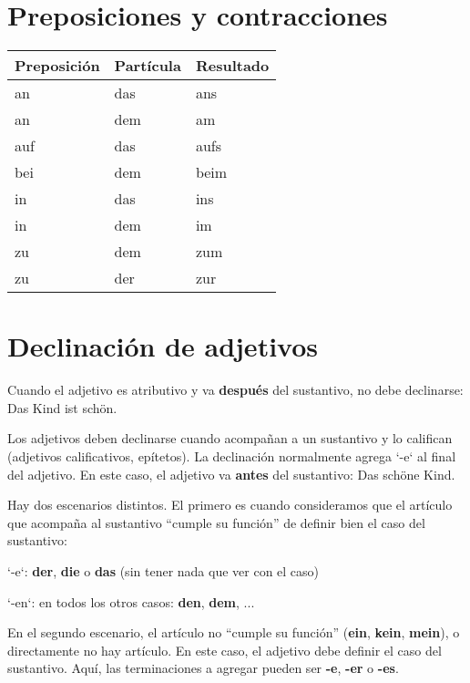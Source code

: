 \section{Preposiciones y contracciones}
\begin{tabular}{| l | l | l |}
\hline
\textbf{Preposición} & \textbf{Partícula} & \textbf{Resultado} \\
\hline
an & das & ans \\
an & dem & am \\
auf & das & aufs \\
bei & dem & beim \\
in & das & ins \\
in & dem & im \\
zu & dem & zum \\
zu & der & zur \\
\hline
\end{tabular}

\section{Declinación de adjetivos}
Cuando el adjetivo es atributivo y va \textbf{después} del sustantivo, no debe declinarse: Das Kind ist schön.

Los adjetivos deben declinarse cuando acompañan a un sustantivo y lo califican (adjetivos calificativos, epítetos). La declinación normalmente agrega `-e` al final del adjetivo. En este caso, el adjetivo va \textbf{antes} del sustantivo: Das schöne Kind. 

Hay dos escenarios distintos. El primero es cuando consideramos que el artículo que acompaña al sustantivo ``cumple su función'' de definir bien el caso del sustantivo:
\begin{myitemize}
\item `-e`: \textbf{der}, \textbf{die} o \textbf{das} (sin tener nada que ver con el caso)
\item `-en`: en todos los otros casos: \textbf{den}, \textbf{dem}, ...
\end{myitemize}

En el segundo escenario, el artículo no ``cumple su función'' (\textbf{ein}, \textbf{kein}, \textbf{mein}), o directamente no hay artículo. En este caso, el adjetivo debe definir el caso del sustantivo. Aquí, las terminaciones a agregar pueden ser \textbf{-e}, \textbf{-er} o \textbf{-es}.

